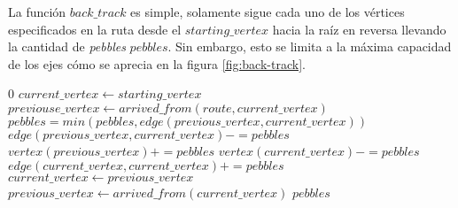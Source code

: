 La función $back\_track$ es simple, solamente sigue cada uno de los vértices especificados en la ruta desde el $starting\_vertex$ hacia la raíz en reversa llevando la cantidad de \emph{pebbles} $pebbles$. Sin embargo, esto se limita a la máxima capacidad de los ejes cómo se aprecia en la figura \ref{fig:back-track}.

\begin{algorithm}
\begin{algorithmic}[1]
		\State
		\Return $0$
	\EndIf
	\State $current\_vertex \gets starting\_vertex$
	\State $previouse\_vertex \gets arrived\_from(route, current\_vertex)$
		\State $pebbles = min(pebbles, edge(previous\_vertex, current\_vertex))$
		\State $edge(previous\_vertex, current\_vertex) \mathrel{{-}{=}} pebbles$
		\State $vertex(previous\_vertex) \mathrel{{+}{=}} pebbles$
		\State $vertex(current\_vertex) \mathrel{{-}{=}} pebbles$
		\State $edge(current\_vertex, current\_vertex) \mathrel{{+}{=}} pebbles$
		\State $current\_vertex \gets previous\_vertex$
		\State $previous\_vertex \gets arrived\_from(current\_vertex)$
	\EndWhile
	\State
	\Return $pebbles$
\EndFunction
\end{algorithmic}
\end{algorithm}

